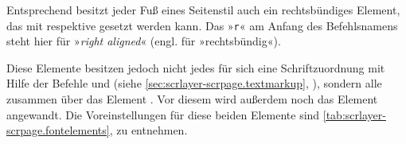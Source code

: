 Entsprechend besitzt jeder Fuß eines Seitenstil auch ein
rechtsbündiges Element, das mit 
respektive  gesetzt werden kann. Das »\texttt{r}« am Anfang des
Befehlsnamens steht hier für »\emph{right aligned}« (engl. für
»rechtsbündig«).

\BeginIndexGroup
{}%
%
Diese Elemente besitzen jedoch nicht jedes für sich eine Schriftzuordnung mit
Hilfe der Befehle  und
 (siehe
\autoref{sec:scrlayer-scrpage.textmarkup},
), sondern alle zusammen über das
Element . Vor diesem
wird außerdem noch das Element
angewandt. Die Voreinstellungen für diese beiden Elemente sind
\autoref{tab:scrlayer-scrpage.fontelements},
 zu entnehmen.%
\EndIndexGroup

